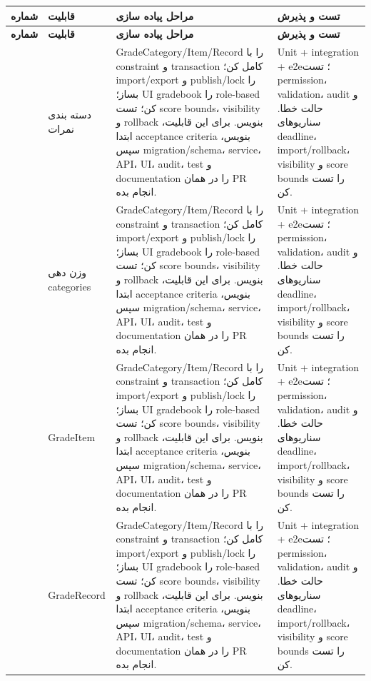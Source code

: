 \documentclass[11pt,a4paper]{article}
\begin{document}
\begin{longtable}{|>{\raggedleft\arraybackslash}p{}|>{\raggedleft\arraybackslash}p{}|>{\raggedleft\arraybackslash}p{}|>{\raggedleft\arraybackslash}p{}|}
\hline
\textbf{شماره} & \textbf{قابلیت} & \textbf{مراحل پیاده سازی} & \textbf{تست و پذیرش} \\\hline
\endfirsthead
\hline
\textbf{شماره} & \textbf{قابلیت} & \textbf{مراحل پیاده سازی} & \textbf{تست و پذیرش} \\\hline
\endhead
121 & دسته بندی نمرات & GradeCategory/Item/Record را با constraint و transaction کامل کن؛ import/export و publish/lock را بساز؛ UI gradebook را role-based کن؛ تست score bounds، visibility و rollback بنویس. برای این قابلیت، ابتدا acceptance criteria بنویس، سپس migration/schema، service، API، UI، audit، test و documentation را در همان PR انجام بده. & Unit + integration + e2e؛ تست permission، validation، audit و حالت خطا. سناریوهای deadline، import/rollback، visibility و score bounds را تست کن. \\ \hline
122 & وزن دهی categories & GradeCategory/Item/Record را با constraint و transaction کامل کن؛ import/export و publish/lock را بساز؛ UI gradebook را role-based کن؛ تست score bounds، visibility و rollback بنویس. برای این قابلیت، ابتدا acceptance criteria بنویس، سپس migration/schema، service، API، UI، audit، test و documentation را در همان PR انجام بده. & Unit + integration + e2e؛ تست permission، validation، audit و حالت خطا. سناریوهای deadline، import/rollback، visibility و score bounds را تست کن. \\ \hline
123 & GradeItem & GradeCategory/Item/Record را با constraint و transaction کامل کن؛ import/export و publish/lock را بساز؛ UI gradebook را role-based کن؛ تست score bounds، visibility و rollback بنویس. برای این قابلیت، ابتدا acceptance criteria بنویس، سپس migration/schema، service، API، UI، audit، test و documentation را در همان PR انجام بده. & Unit + integration + e2e؛ تست permission، validation، audit و حالت خطا. سناریوهای deadline، import/rollback، visibility و score bounds را تست کن. \\ \hline
124 & GradeRecord & GradeCategory/Item/Record را با constraint و transaction کامل کن؛ import/export و publish/lock را بساز؛ UI gradebook را role-based کن؛ تست score bounds، visibility و rollback بنویس. برای این قابلیت، ابتدا acceptance criteria بنویس، سپس migration/schema، service، API، UI، audit، test و documentation را در همان PR انجام بده. & Unit + integration + e2e؛ تست permission، validation، audit و حالت خطا. سناریوهای deadline، import/rollback، visibility و score bounds را تست کن. \\ \hline

\end{longtable}
\end{document}
